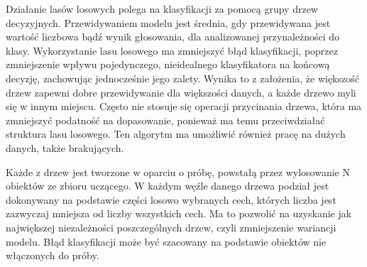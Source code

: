 Działanie lasów losowych polega na klasyfikacji za pomocą grupy drzew decyzyjnych. Przewidywaniem modelu jest średnia, gdy przewidywana jest wartość liczbowa bądź wynik głosowania, dla analizowanej przynależności do klasy. Wykorzystanie lasu losowego ma zmniejszyć błąd klasyfikacji, poprzez zmniejszenie wpływu pojedynczego, nieidealnego klasyfikatora na końcową decyzję, zachowując jednocześnie jego zalety. Wynika
to z założenia, że większość drzew zapewni dobre przewidywanie dla większości danych, a każde
drzewo myli się w innym miejscu. Często nie stosuje się operacji przycinania drzewa, która ma zmniejszyć podatność na dopasowanie, ponieważ ma temu przeciwdziałać struktura lasu losowego.  Ten algorytm ma umożliwić również pracę na dużych danych,
także brakujących.

Każde z drzew jest tworzone w oparciu o próbę, powstałą przez wylosowanie N obiektów ze zbioru uczącego. W każdym węźle danego drzewa podział jest dokonywany  na podstawie części losowo wybranych cech, których liczba jest zazwyczaj mniejsza od liczby wszystkich cech. Ma to pozwolić na uzyskanie jak największej niezależności poszczególnych drzew, czyli zmniejszenie wariancji modelu. Błąd klasyfikacji może być szacowany na podstawie obiektów nie
włączonych do próby.



